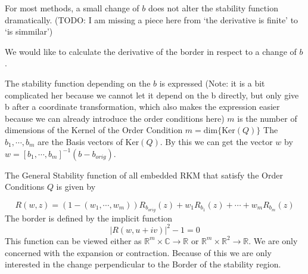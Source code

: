 \documentclass[a4paper]{scrartcl}
\numberwithin{equation}{section}
\theoremstyle{plain}
\theoremstyle{definition}
\numberwithin{theorem}{section}
\newcommand{\R}{\mathbb{R}}
\newcommand{\CN}{\mathbb{C}}
\newcommand{\1}{\mathbbm{1}}
\begin{document}
For most methods, a small change of $b$ does not alter the stability function dramatically.
(TODO: I am missing a piece here from ‘the derivative is finite’ to ‘is simmilar’)

We would like to calculate the derivative of the border in respect to a change of $b$. 

The stability function depending on the $b$ is expressed (Note: it is a bit complicated her because we cannot let it depend on the b directly, but only give b after a coordinate transformation, which also makes the expression easier because we can already introduce the order conditions here)
$m$ is the number of dimensions of the Kernel of the Order Condition $m = \mathrm{dim}\{\mathrm{Ker} (Q) \}$
The $b_1,\cdots,b_m$  are the Basis vectors of $\mathrm{Ker} (Q)$. By this we can get the vector $w$ by $w = \left[b_1,\cdots,b_m\right]^{-1}(b-b_{orig})$.

The General Stability function of all embedded RKM that satisfy the Order Conditions $Q$ is given by 

\begin{equation}\label{eq:gen_stabilityf}
R(w,z) = (1-(w_1,\cdots,w_m))R_{b_{orig}}(z) + w_1 R_{b_1}(z) + \cdots + w_m R_{b_m}(z)
\end{equation}
The border is defined by the implicit function 
\begin{equation}\label{eq:border}
|R(w,u+iv)|^2 -1 = 0
\end{equation}
This function can be viewed either as $\R^m \times  \CN \rightarrow \R$ or $\R^m \times  \R^2 \rightarrow \R$.
We are only concerned with the expansion or contraction. Because of this we are only interested in the change perpendicular to the Border of the stability region. 
\end{document}
